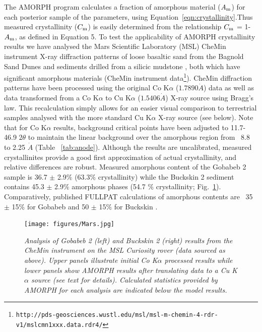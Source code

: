 \documentclass[review]{elsarticle}
\begin{document}
The AMORPH program calculates a fraction of amorphous material ($A_{\rm m}$) for each posterior sample of the parameters,
using Equation~\ref{eqn:crystallinity}.Thus measured crystallinity ($C_{\rm m}$) is easily determined from the relationship $C_{\rm m}$ = 1-$A_{\rm m}$, as defined in Equation 5. 
To test the applicability of AMORPH crystallinity results we have analysed the Mars Scientific Laboratory (MSL)  CheMin instrument X-ray diffraction patterns of loose basaltic sand from the Bagnold Sand Dunes \citep[Gobabeb;][]{achilles2017, lapotre2017}
and sediments drilled from a silicic mudstone \citep[Buckskin sample;][]{morris2016}, both which have significant amorphous
materials (CheMin instrument data\footnote{\tt http://pds-geosciences.wustl.edu/msl/msl-m-chemin-4-rdr-v1/mslcmn{\textunderscore}1xxx.data.rdr4/}). CheMin diffraction patterns have been processed using the original Co K$\alpha$ ($1.7890 \dot{A}$) data as well as data transformed from a Co K$\alpha$ to Cu K$\alpha$ ($1.5406 \dot{A}$) X-ray source using Bragg's law. This recalculation simply allows for an easier visual comparison to terrestrial samples analysed with the more standard Cu K$\alpha$ X-ray source (see below). Note that for Co K$\alpha$ results, background critical points have been adjusted to 11.7-46.9 $2\theta$ to maintain the linear background over the amorphous region from ~8.8 to 2.25 $\dot{A}$ (Table ~\ref{tab:anode}). Although the results are uncalibrated, measured crystallinites provide a good first approximation of actual crystallinity, and relative differences are robust. Measured amorphous content of the Gobabeb 2 sample is 36.7 $\pm$ 2.9$\%$ (63.3$\%$ crystallinity) while the Buckskin 2 sediment contains 45.3 $\pm$ 2.9$\%$ amorphous phases (54.7 $\%$ crystallinity; Fig.~\ref{fig:Mars}). Comparatively, published FULLPAT calculations of amorphous contents are ~35 $\pm$ 15$\%$ for Gobabeb and 50 $\pm$ 15$\%$ for Buckskin \citep{achilles2017, morris2016}. 

\begin{figure}[!ht]
\centering
\texttt{[image: figures/Mars.jpg]}
\caption{\it Analysis of Gobabeb 2 (left) and Buckskin 2 (right) results from the CheMin instrument on the MSL Curiosity rover (data sourced as above). Upper panels  illustrate initial Co K$\alpha$ processed results while lower panels show AMORPH results after translating data to a Cu K$\alpha$ source (see text for details). Calculated statistics provided by AMORPH for each analysis are indicated below the model results.\label{fig:Mars}}
\end{figure}
\end{document}
